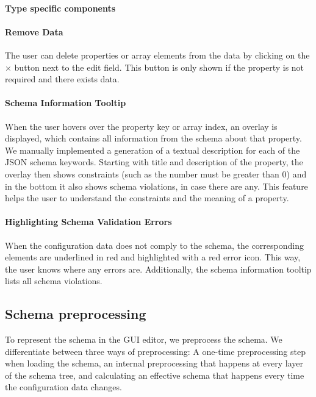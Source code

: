 
\paragraph{Type specific components}


\paragraph{Remove Data}
The user can delete properties or array elements from the data by clicking on the $\times$ button next to the edit field.
This button is only shown if the property is not required and there exists data.

\paragraph{Schema Information Tooltip}
When the user hovers over the property key or array index, an overlay is displayed, which contains all information from the schema about that property.
We manually implemented a generation of a textual description for each of the JSON schema keywords.
Starting with title and description of the property, the overlay then shows constraints (such as the number must be greater than 0) and in the bottom it also shows schema violations, in case there are any.
This feature helps the user to understand the constraints and the meaning of a property.

\paragraph{Highlighting Schema Validation Errors}
When the configuration data does not comply to the schema, the corresponding elements are underlined in red and highlighted with a red error icon.
This way, the user knows where any errors are.
Additionally, the schema information tooltip lists all schema violations.

\subsection{Schema preprocessing}\label{subsec:schema-preprocessing}

To represent the schema in the GUI editor, we preprocess the schema.
We differentiate between three ways of preprocessing:
A one-time preprocessing step when loading the schema, an internal preprocessing that happens at every layer of the schema tree,
and calculating an effective schema that happens every time the configuration data changes.

